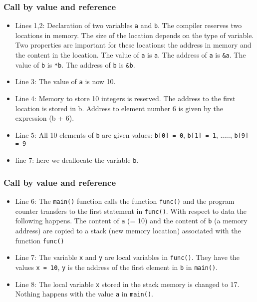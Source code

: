 \documentclass[handout]{beamer}
\begin{document}
\begin{frame}
\frametitle{Call by value and reference}

\begin{itemize}
  \item Lines 1,2: Declaration of two variables \Verb!a! and \Verb!b!. The compiler reserves two locations in memory. The size of the location depends on the type of variable. Two properties are important for these locations: the address in memory and the content in the location. The value of \Verb!a! is \Verb!a!. The address of \Verb!a! is \Verb!&a!. The value of \Verb!b! is \Verb!*b!. The address of \Verb!b! is \Verb!&b!.

  \item Line 3: The value of \Verb!a! is now 10.

  \item Line 4: Memory to store 10 integers is reserved. The address to the first location is stored in b. Address to element number 6 is given by the expression (b + 6).

  \item Line 5: All 10 elements of \Verb!b! are given values: \Verb!b[0] = 0!, \Verb!b[1] = 1!, ....., \Verb!b[9] = 9!

  \item line 7: here we deallocate the variable \Verb!b!.
\end{itemize}

\noindent
\end{frame}

\begin{frame}
\frametitle{Call by value and reference}

\begin{itemize}
  \item Line 6: The \Verb!main()! function calls the function \Verb!func()! and the program counter transfers to the first statement in \Verb!func()!. With respect to data the following happens. The content of \Verb!a! (= 10) and the content of \Verb!b! (a memory address) are copied to a stack (new memory location) associated with the function \Verb!func()!

  \item Line 7: The variable \Verb!x! and \Verb!y! are local variables in \Verb!func()!. They have the values  \Verb!x = 10!, \Verb!y! is the address of the first element in \Verb!b! in \Verb!main()!.

  \item Line 8: The local variable \Verb!x! stored in the stack memory is changed to 17. Nothing happens with the value \Verb!a! in \Verb!main()!.
\end{itemize}

\noindent
\end{frame}
\end{document}
